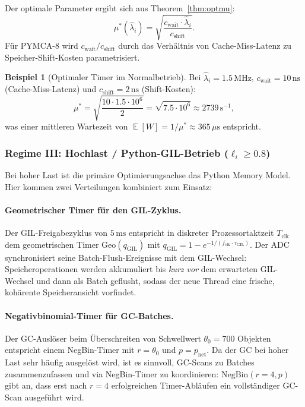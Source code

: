 ﻿\documentclass[a4paper,12pt]{scrreprt}
\theoremstyle{definition}
\newtheorem{beispiel}{Beispiel}[section]
\DeclareMathOperator{\E}{\mathbb{E}}
\newcommand{\Geo}{\mathrm{Geo}}
\newcommand{\NBin}{\mathrm{NegBin}}
\begin{document}
	Der optimale Parameter ergibt sich aus Theorem~\ref{thm:optmu}:
	\begin{equation}
		\mu^*(\hat\lambda_i) = \sqrt{\frac{c_{\mathrm{wait}} \cdot \hat\lambda_i}
			{c_{\mathrm{shift}}}}.
		\label{eq:muopt_concrete}
	\end{equation}
	Für PYMCA-8 wird $c_{\mathrm{wait}} / c_{\mathrm{shift}}$ durch das
	Verhältnis von Cache-Miss-Latenz zu Speicher-Shift-Kosten parametrisiert.
	
	\begin{beispiel}[Optimaler Timer im Normalbetrieb]
		Bei $\hat\lambda_i = 1.5\,\mathrm{MHz}$, $c_{\mathrm{wait}} = 10\,\mathrm{ns}$
		(Cache-Miss-Latenz) und $c_{\mathrm{shift}} = 2\,\mathrm{ns}$ (Shift-Kosten):
		\[
		\mu^* = \sqrt{\frac{10 \cdot 1.5 \cdot 10^6}{2}} = \sqrt{7.5 \cdot 10^6}
		\approx 2739\,\mathrm{s}^{-1},
		\]
		was einer mittleren Wartezeit von $\E[W] = 1/\mu^* \approx 365\,\mu\mathrm{s}$
		entspricht.
	\end{beispiel}
	
	\subsubsection{Regime III: Hochlast / Python-GIL-Betrieb ($\ell_i \ge 0.8$)}
	
	Bei hoher Last ist die primäre Optimierungsachse das Python Memory Model.
	Hier kommen zwei Verteilungen kombiniert zum Einsatz:
	
	\paragraph{Geometrischer Timer für den GIL-Zyklus.}
	Der GIL-Freigabezyklus von $5\,\mathrm{ms}$ entspricht in diskreter
	Prozessortaktzeit $T_{\mathrm{clk}}$ dem geometrischen Timer
	$\Geo(q_{\mathrm{GIL}})$ mit $q_{\mathrm{GIL}} = 1 - e^{-1/(f_{\mathrm{clk}}
		\cdot \tau_{\mathrm{GIL}})}$. Der ADC synchronisiert seine Batch-Flush-Ereignisse
	mit dem GIL-Wechsel: Speicheroperationen werden akkumuliert bis
	\emph{kurz vor} dem erwarteten GIL-Wechsel und dann als Batch geflusht,
	sodass der neue Thread eine frische, kohärente Speicheransicht vorfindet.
	
	\paragraph{Negativbinomial-Timer für GC-Batches.}
	Der GC-Auslöser beim Überschreiten von Schwellwert $\theta_0 = 700$
	Objekten entspricht einem NegBin-Timer mit $r = \theta_0$ und
	$p = p_{\mathrm{net}}$. Da der GC bei hoher Last sehr häufig
	ausgelöst wird, ist es sinnvoll, GC-Scans zu Batches zusammenzufassen
	und via NegBin-Timer zu koordinieren: $\NBin(r=4, p)$ gibt an, dass
	erst nach $r=4$ erfolgreichen Timer-Abläufen ein vollständiger
	GC-Scan ausgeführt wird.
	
\end{document}

